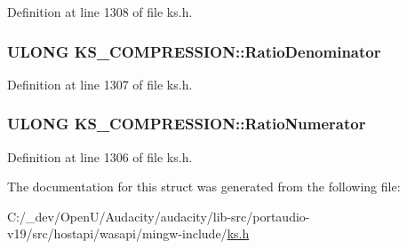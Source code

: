 Definition at line 1308 of file ks.\+h.

\subsubsection[{\texorpdfstring{Ratio\+Denominator}{RatioDenominator}}]{\setlength{\rightskip}{0pt plus 5cm}U\+L\+O\+NG K\+S\+\_\+\+C\+O\+M\+P\+R\+E\+S\+S\+I\+O\+N\+::\+Ratio\+Denominator}\hypertarget{struct_k_s___c_o_m_p_r_e_s_s_i_o_n_a29316b7c677bd3593807cf5de26c8234}{}\label{struct_k_s___c_o_m_p_r_e_s_s_i_o_n_a29316b7c677bd3593807cf5de26c8234}


Definition at line 1307 of file ks.\+h.

\subsubsection[{\texorpdfstring{Ratio\+Numerator}{RatioNumerator}}]{\setlength{\rightskip}{0pt plus 5cm}U\+L\+O\+NG K\+S\+\_\+\+C\+O\+M\+P\+R\+E\+S\+S\+I\+O\+N\+::\+Ratio\+Numerator}\hypertarget{struct_k_s___c_o_m_p_r_e_s_s_i_o_n_aa7503a4b4300c8e2aa9c3d78cdbdf4c0}{}\label{struct_k_s___c_o_m_p_r_e_s_s_i_o_n_aa7503a4b4300c8e2aa9c3d78cdbdf4c0}


Definition at line 1306 of file ks.\+h.



The documentation for this struct was generated from the following file\+:\begin{DoxyCompactItemize}
\item 
C\+:/\+\_\+dev/\+Open\+U/\+Audacity/audacity/lib-\/src/portaudio-\/v19/src/hostapi/wasapi/mingw-\/include/\hyperlink{ks_8h}{ks.\+h}\end{DoxyCompactItemize}
